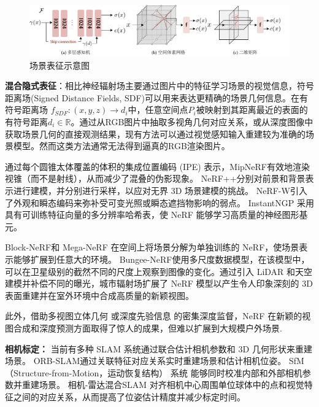 \begin{figure}[t]
    \centering
    \includegraphics[width=\textwidth]{undergraduate-thesis/images/Scene Representations.pdf}
    \caption{场景表征示意图}
    \label{fig:scene-representation}
\end{figure}

\textbf{混合隐式表征}：相比神经辐射场主要通过图片中的特征学习场景的视觉信息，符号距离场(Signed Distance Fields, SDF)可以用来表达更精确的场景几何信息。在有符号距离场 $f_{SDF}:(x,y,z)→d_i$中，任意空间点$P_i$被映射到其距离最近的表面的有符号距离$d_i\in \mathbb{R}$。通过从RGB图片中抽取多视角几何对应关系，或从深度图像中获取场景几何的直接观测结果，现有方法可以通过视觉感知输入重建较为准确的场景模型。然而这类方法通常无法得到逼真的RGB渲染图片。

通过每个圆锥太体覆盖的体积的集成位置编码 (IPE) 表示，MipNeRF\cite{barron_mip-nerf_2021}有效地渲染视锥（而不是射线），从而减少了混叠的伪影现象。 NeRF++\cite{zhang_nerf_2020}分别对前景和背景表示进行建模，并分别进行采样，以应对无界 3D 场景建模的挑战。 NeRF-W\cite{martin-brualla_nerf_2021}引入了外观和瞬态编码来弥补受可变光照或瞬态遮挡物影响的弱点。 InstantNGP\cite{muller_instant_2022} 采用具有可训练特征向量的多分辨率哈希表，使 NeRF 能够学习高质量的神经图形基元。

Block-NeRF\cite{tancik_block-nerf_2022}和 Mega-NeRF\cite{turki_mega-nerf_2022} 在空间上将场景分解为单独训练的 NeRF，使场景表示能够扩展到任意大的环境。 Bungee-NeRF\cite{xiangli_bungeenerf_2022}使用多尺度数据模型，在该模型中，可以在卫星级别的截然不同的尺度上观察到图像的变化。通过引入 LiDAR 和天空建模并补偿不同的曝光，城市辐射场\cite{rematas_urban_2022}扩展了 NeRF 模型以产生令人印象深刻的 3D 表面重建并在室外环境中合成高质量的新颖视图。

此外，借助多视图立体几何\cite{deng_depth-supervised_2022} 或深度先验信息\cite{roessle_dense_2022} 的密集深度监督，NeRF 在新颖的视图合成和深度预测方面取得了惊人的成果，但难以扩展到大规模户外场景.

\textbf{相机标定：}
当前有多种 SLAM 系统通过联合估计相机参数和 3D 几何形状来重建场景。 ORB-SLAM\cite{mur-artal_orb-slam_2015}通过关联特征对应关系实时重建场景和估计相机位姿。 SfM（Structure-from-Motion，运动恢复结构） 系统\cite{schonberger_structure--motion_2016, chen_uncertainty-driven_2023} 能够同时校准内部和外部相机参数并重建场景。 相机-雷达混合SLAM\cite{kong_vmap_2023, deng_nerf-loam_2023} 对齐相机中心周围单位球体中的点和视觉特征之间的对应关系，从而提高了位姿估计精度并减少标定时间。

